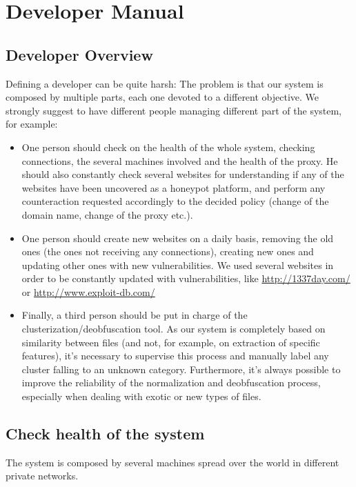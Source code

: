 \section{Developer Manual}

\subsection{Developer Overview}

Defining a developer can be quite harsh: The problem is that our system is composed by multiple parts, each one devoted to a different objective. We strongly suggest to have different people managing different part of the system, for example:

\begin{itemize}
\item
One person should check on the health of the whole system, checking connections, the several machines involved and the health of the proxy. He should also constantly check several websites for understanding if any of the websites have been uncovered as a honeypot platform, and perform any counteraction requested accordingly to the decided policy (change of the domain name, change of the proxy etc.).
\item One person should create new websites on a daily basis, removing the old ones (the ones not receiving any connections), creating new ones and updating other ones with new vulnerabilities. We used several websites in order to be constantly updated with vulnerabilities, like \url{http://1337day.com/} or \url{http://www.exploit-db.com/}
\item Finally, a third person should be put in charge of the clusterization/deobfuscation tool. As our system is completely based on similarity between files (and not, for example, on extraction of specific features), it's necessary to supervise this process and manually label any cluster falling to an unknown category. Furthermore, it's always possible to improve the reliability of the normalization and deobfuscation process, especially when dealing with exotic or new types of files.
\end{itemize}

\subsection{Check health of the system}

The system is composed by several machines spread over the world in different private networks.

